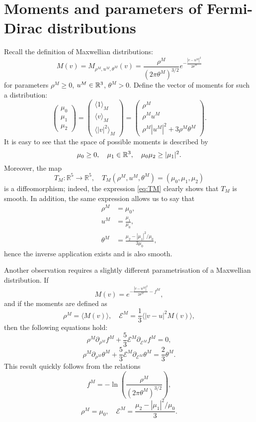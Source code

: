
\section[Moments and parameters of Fermi-Dirac distributions][Moments and parameters]{Moments and parameters of Fermi-Dirac distributions}
\label{sec:moments}
Recall the definition of Maxwellian distributions:
\begin{equation*}
M(v)=M_{\rho^M,u^M,\theta^M}(v)	=\frac{\rho^M}{(2\pi\theta^M)^{3/2}}e^{-\frac{\left|v-u^M\right	|^2}{2\theta^M}}
\end{equation*}
for parameters $\rho^M\ge 0$, $u^M\in{\mathbb {R}^3}$, $\theta^M>0$. Define the vector of moments for such a distribution:
\begin{equation}\label{eq:TM}
	\begin{pmatrix}
		\mu_0\\\mu_1\\\mu_2
	\end{pmatrix}=
	\begin{pmatrix}
		\langle 1\rangle_M\\\langle v\rangle_M\\\langle |v|^2\rangle_M
	\end{pmatrix} = \begin{pmatrix}
		\rho^M\\\rho^M u^M\\\rho^M|u^M|^2+3\rho^M\theta^M
	\end{pmatrix}.
\end{equation}
It is easy to see that the space of possible moments is described by \[\mu_0\ge 0,\quad \mu_1\in{\mathbb {R}^3},\quad \mu_0\mu_2\ge |\mu_1|^2.\]
Moreover, the map
\[T_M:\mathbb R^5\to \mathbb R^5, \quad T_M(\rho^M,u^M,\theta^M) = (\mu_0,\mu_1,\mu_2)\]
is a diffeomorphism; indeed, the expression \eqref{eq:TM} clearly shows that $T_M$ is smooth. In addition, the same expression allows us to say that
\begin{align*}
	\rho^M&=\mu_0,\\
	u^M&=\frac{\mu_1}{\mu_0},\\
	\theta^M&=\frac{\mu_2-|\mu_1|^2/\mu_0}{3\mu_0},
\end{align*}
hence the inverse application exists and is also smooth.

Another observation requires a slightly different parametrisation of a Max\-wel\-lian distribution.   If
 \[M(v) = e^{-\frac{|v-u^M|^2}{2\theta^M}-f^M },\]
 and if the moments are defined as \[\rho^M = \langle M(v)\rangle,\quad \mathcal E^M = \frac 13 \langle |v-u|^2M(v)\rangle,\]
 then the following equations hold:
\[\rho^M\partial_{\rho^M} f^M +\frac 53\mathcal E^M \partial_{\mathcal E^M}f^M=0, \]
\[\rho^M\partial_{\rho^M} \theta^M +\frac 53\mathcal E^M \partial_{\mathcal E^M}\theta^M=\frac 23\theta^M.\]
This result quickly follows from the relations 
\[f^M = -\ln\left(\frac{\rho^M}{(2\pi\theta^M)^{3/2}}\right),\]
\[\rho^M = \mu_0,\quad \mathcal E^M =\frac{\mu_2-|\mu_1|^2/\mu_0}{3}.\]


